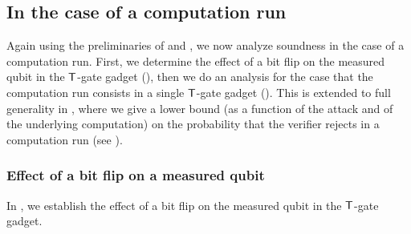 \documentclass{toc}
\newcommand{\tgate}{{\sf T}}
\begin{document}
%
\subsection{In the case of a computation run}
\label{sec:soundness-computation run}

 Again using the preliminaries of  and , we now analyze soundness in the case of a computation run. First, we determine the effect of a bit flip on the measured qubit in the $\tgate$-gate gadget (), then we do an analysis for the case that the computation run consists in
a single $\tgate$-gate gadget ().
%
  This is extended to full generality in , where we give a lower bound (as a function of the attack and of the underlying computation) on the probability that the verifier rejects in a computation run (see ).



\subsubsection{Effect of a bit flip on a measured qubit}
\label{sec:effect-X-gate-output}
In , we establish the effect of a bit flip on the measured qubit in the $\tgate$-gate gadget.
\end{document}
